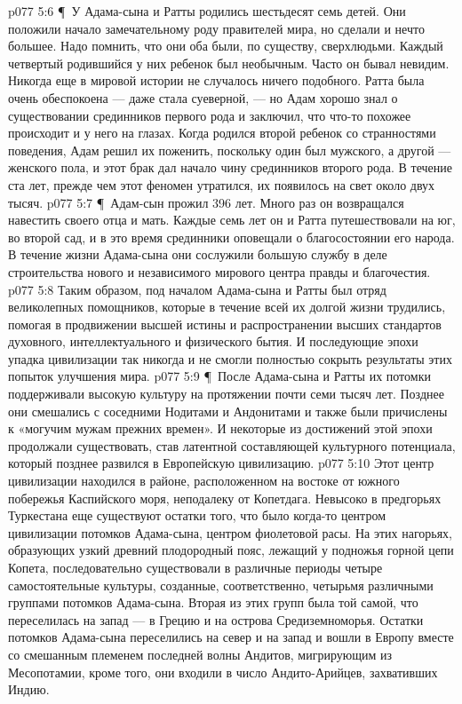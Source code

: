 \vs p077 5:6 \P\ У Адама\hyp{}сына и Ратты родились шестьдесят семь детей. Они положили начало замечательному роду правителей мира, но сделали и нечто большее. Надо помнить, что они оба были, по существу, сверхлюдьми. Каждый четвертый родившийся у них ребенок был необычным. Часто он бывал невидим. Никогда еще в мировой истории не случалось ничего подобного. Ратта была очень обеспокоена --- даже стала суеверной, --- но Адам хорошо знал о существовании срединников первого рода и заключил, что что\hyp{}то похожее происходит и у него на глазах. Когда родился второй ребенок со странностями поведения, Адам решил их поженить, поскольку один был мужского, а другой --- женского пола, и этот брак дал начало чину срединников второго рода. В течение ста лет, прежде чем этот феномен утратился, их появилось на свет около двух тысяч.
\vs p077 5:7 \P\ Адам\hyp{}сын прожил 396 лет. Много раз он возвращался навестить своего отца и мать. Каждые семь лет он и Ратта путешествовали на юг, во второй сад, и в это время срединники оповещали о благосостоянии его народа. В течение жизни Адама\hyp{}сына они сослужили большую службу в деле строительства нового и независимого мирового центра правды и благочестия.
\vs p077 5:8 Таким образом, под началом Адама\hyp{}сына и Ратты был отряд великолепных помощников, которые в течение всей их долгой жизни трудились, помогая в продвижении высшей истины и распространении высших стандартов духовного, интеллектуального и физического бытия. И последующие эпохи упадка цивилизации так никогда и не смогли полностью сокрыть результаты этих попыток улучшения мира.
\vs p077 5:9 \P\ После Адама\hyp{}сына и Ратты их потомки поддерживали высокую культуру на протяжении почти семи тысяч лет. Позднее они смешались с соседними Нодитами и Андонитами и также были причислены к «могучим мужам прежних времен». И некоторые из достижений этой эпохи продолжали существовать, став латентной составляющей культурного потенциала, который позднее развился в Европейскую цивилизацию.
\vs p077 5:10 Этот центр цивилизации находился в районе, расположенном на востоке от южного побережья Каспийского моря, неподалеку от Копетдага. Невысоко в предгорьях Туркестана еще существуют остатки того, что было когда\hyp{}то центром цивилизации потомков Адама\hyp{}сына, центром фиолетовой расы. На этих нагорьях, образующих узкий древний плодородный пояс, лежащий у подножья горной цепи Копета, последовательно существовали в различные периоды четыре самостоятельные культуры, созданные, соответственно, четырьмя различными группами потомков Адама\hyp{}сына. Вторая из этих групп была той самой, что переселилась на запад --- в Грецию и на острова Средиземноморья. Остатки потомков Адама\hyp{}сына переселились на север и на запад и вошли в Европу вместе со смешанным племенем последней волны Андитов, мигрирующим из Месопотамии, кроме того, они входили в число Андито\hyp{}Арийцев, захвативших Индию.
